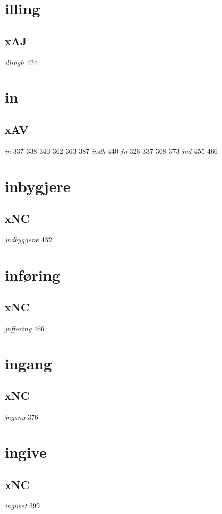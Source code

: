 \documentclass[a4paper,twocolumn]{article}
\begin{document}
\section{illing}
\label{sec:orgdbad2d6}
\subsection{xAJ}
\label{sec:orgab7963b}
\emph{illingh} 424 
\section{in}
\label{sec:org51de16c}
\subsection{xAV}
\label{sec:org3b050e2}
\emph{in} 337 338 340 362 363 387 \emph{indh} 440 \emph{jn} 326 337 368 373 \emph{jnd} 455 466 
\section{inbygjere}
\label{sec:org251a12e}
\subsection{xNC}
\label{sec:org256c8a4}
\emph{jndbyggeræ} 432 
\section{inføring}
\label{sec:org1f23406}
\subsection{xNC}
\label{sec:orge224f27}
\emph{jnfforing} 466 
\section{ingang}
\label{sec:org9fc74d7}
\subsection{xNC}
\label{sec:org13a5b56}
\emph{jngang} 376 
\section{ingive}
\label{sec:org10f93c1}
\subsection{xNC}
\label{sec:org5f0538e}
\emph{ingiwet} 399 
\end{document}

